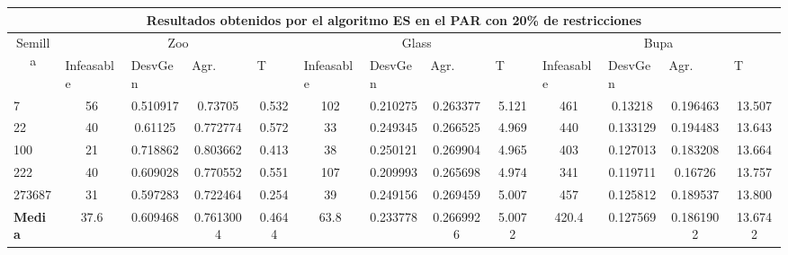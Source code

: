 \begin{table}[H]
	\tiny

	\begin{adjustwidth}{-1cm}{-1cm}%
	
	\begin{tabular}{|l|c|c|c|c|c|c|c|c|c|c|c|c|}
	\hline
	\multicolumn{13}{|c|}{\textbf{Resultados obtenidos por el algoritmo ES en el PAR con 20\% de restricciones}}                                                                                                                                                                                                                                                                                                                                            \\ \hline
	\multicolumn{1}{|c|}{\multirow{2}{*}{Semilla}} & \multicolumn{4}{c|}{Zoo}                                                                                          & \multicolumn{4}{c|}{Glass}                                                                                         & \multicolumn{4}{c|}{Bupa}                                                                                          \\ \cline{2-13} 
	\multicolumn{1}{|c|}{}                                  & \multicolumn{1}{l|}{Infeasable} & \multicolumn{1}{l|}{DesvGen} & \multicolumn{1}{l|}{Agr.} & \multicolumn{1}{l|}{T} & \multicolumn{1}{l|}{Infeasable} & \multicolumn{1}{l|}{DesvGen} & \multicolumn{1}{l|}{Agr.} & \multicolumn{1}{l|}{T} & \multicolumn{1}{l|}{Infeasable} & \multicolumn{1}{l|}{DesvGen} & \multicolumn{1}{l|}{Agr.} & \multicolumn{1}{l|}{T} \\ \hline
	7   	& 56 & 0.510917 & 0.73705 & 0.532 & 			102 & 0.210275 & 0.263377 & 5.121 &			 	461 & 0.13218 & 0.196463 & 13.507 		\\ \hline
	22 		& 40 & 0.61125 & 0.772774 & 0.572 &			33 & 0.249345 & 0.266525 & 4.969 &		 			440 & 0.133129 & 0.194483 & 13.643		\\ \hline
	100 	& 21 & 0.718862 & 0.803662 & 0.413 &			38 & 0.250121 & 0.269904 & 4.965 &				403 & 0.127013 & 0.183208 & 13.664		\\ \hline
	222 	& 40 & 0.609028 & 0.770552 & 0.551 &				107 & 0.209993 & 0.265698 & 4.974 &			341 & 0.119711 & 0.16726 & 13.757		\\ \hline
	273687 	& 31 & 0.597283 & 0.722464 & 0.254 & 			39 & 0.249156 & 0.269459 & 5.007 &				457 & 0.125812 & 0.189537 & 13.800		\\ \hline
	\textbf{Media} & 37.6 &	0.609468&	0.7613004	&0.4644	&63.8&	0.233778&	0.2669926&	5.0072&	420.4 & 0.127569&	0.1861902	& 13.6742  \\ \hline
	\end{tabular}
	
	\end{adjustwidth}
	
\end{table}	

